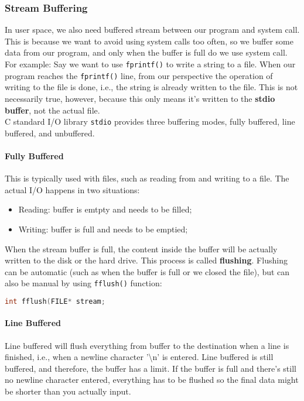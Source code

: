 \documentclass{article}
\newcommand{\bold}[1]{\textbf{#1}}
\renewcommand{\b}{\item[$\circ$]}
\newcommand{\newlist}{\begin{itemize}}
\renewcommand{\endlist}{\end{itemize}}
\newcommand{\code}[1]{\texttt{#1}}
\begin{document}
\subsubsection{Stream Buffering}

In user space, we also need buffered stream between our program and system call. This is because we want to avoid using system calls too often, so we buffer some data from our program, and only when the buffer is full do we use system call. For example: Say we want to use \code{fprintf()} to write a string to a file. When our program reaches the \code{fprintf()} line, from our perspective the operation of writing to the file is done, i.e., the string is already written to the file. This is not necessarily true, however, because this only means it's written to the \bold{stdio buffer}, not the actual file. \\

C standard I/O library \code{stdio} provides three buffering modes, fully buffered, line buffered, and unbuffered. \\

\paragraph{Fully Buffered}

This is typically used with files, such as reading from and writing to a file. The actual I/O happens in two situations: 

\newlist
\b Reading: buffer is emtpty and needs to be filled;
\b Writing: buffer is full and needs to be emptied;
\endlist

When the stream buffer is full, the content inside the buffer will be actually written to the disk or the hard drive. This process is called \bold{flushing}. Flushing can be automatic (such as when the buffer is full or we closed the file), but can also be manual by using \code{fflush()} function:

\begin{lstlisting}[language=C]
int fflush(FILE* stream;
\end{lstlisting}

\paragraph{Line Buffered}

Line buffered will flush everything from buffer to the destination when a line is finished, i.e., when a newline character '\textbackslash n' is entered. Line buffered is still buffered, and therefore, the buffer has a limit. If the buffer is full and there's still no newline character entered, everything has to be flushed so the final data might be shorter than you actually input. 
\end{document}
